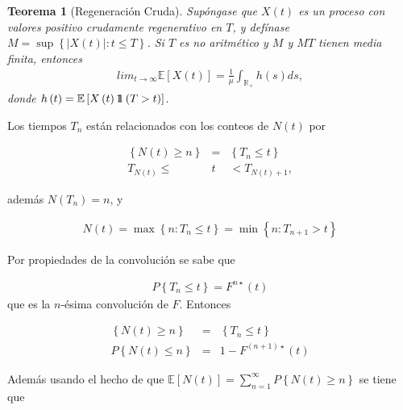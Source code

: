 \documentclass{article}
\newtheorem{Teo}{Teorema}
\newcommand{\rea}{\mathbb{R}}
\newcommand{\esp}{\mathbb{E}}
\newcommand{\indora}{\mbox{$1$\hspace{-0.8ex}$1$}}
\begin{document}
\begin{Teo}[Regeneraci\'on Cruda]
Sup\'ongase que $X\left(t\right)$ es un proceso con valores positivo crudamente regenerativo en $T$, y def\'inase $M=\sup\left\{|X\left(t\right)|:t\leq T\right\}$. Si $T$ es no aritm\'etico y $M$ y $MT$ tienen media finita, entonces
\begin{eqnarray*}
lim_{t\rightarrow\infty}\esp\left[X\left(t\right)\right]=\frac{1}{\mu}\int_{\rea_{+}}h\left(s\right)ds,
\end{eqnarray*}
donde $h\left(t\right)=\esp\left[X\left(t\right)\indora\left(T>t\right)\right]$.
\end{Teo}

%
%

Los tiempos $T_{n}$ est\'an relacionados con los conteos de $N\left(t\right)$ por

\begin{eqnarray*}
\left\{N\left(t\right)\geq n\right\}&=&\left\{T_{n}\leq t\right\}\\
T_{N\left(t\right)}\leq &t&<T_{N\left(t\right)+1},
\end{eqnarray*}

adem\'as $N\left(T_{n}\right)=n$, y 

\begin{eqnarray*}
N\left(t\right)=\max\left\{n:T_{n}\leq t\right\}=\min\left\{n:T_{n+1}>t\right\}
\end{eqnarray*}

Por propiedades de la convoluci\'on se sabe que

\begin{eqnarray*}
P\left\{T_{n}\leq t\right\}=F^{n\star}\left(t\right)
\end{eqnarray*}
que es la $n$-\'esima convoluci\'on de $F$. Entonces 

\begin{eqnarray*}
\left\{N\left(t\right)\geq n\right\}&=&\left\{T_{n}\leq t\right\}\\
P\left\{N\left(t\right)\leq n\right\}&=&1-F^{\left(n+1\right)\star}\left(t\right)
\end{eqnarray*}

Adem\'as usando el hecho de que $\esp\left[N\left(t\right)\right]=\sum_{n=1}^{\infty}P\left\{N\left(t\right)\geq n\right\}$
se tiene que
\end{document}
